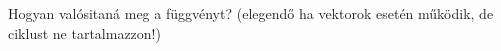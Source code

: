 Hogyan valósitaná meg a  függvényt? (elegendő ha vektorok esetén 
működik, de ciklust ne tartalmazzon!)